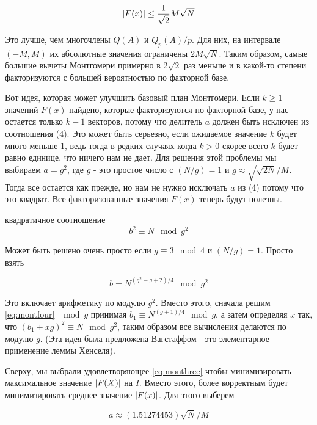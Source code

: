 \documentclass[a4paper,12pt]{report}
\DeclarePairedDelimiter\abs{\lvert}{\rvert}%
\begin{document}
\begin{equation*}
\abs{F(x)} \leq \frac{1}{\sqrt{2}}M\sqrt{N}
\end{equation*}

Это лучше, чем многочлены $Q(A)$ и $Q_p(A)/p$. Для них, на интервале $(-M, M)$ их абсолютные значения ограничены $2M\sqrt{N}$. Таким образом, самые большие вычеты Монтгомери примерно в $2\sqrt{2}$ раз меньше и в какой-то степени факторизуются с большей вероятностью по факторной базе.

Вот идея, которая может улучшить базовый план Монтгомери. Если $k \geq 1$ значений $F(x)$ найдено, которые факторизуются по факторной базе, у нас остается только $k - 1$ векторов, потому что делитель $a$ должен быть исключен из соотношения (4). Это может быть серьезно, если ожидаемое значение $k$ будет много меньше 1, ведь тогда в редких случаях когда $k > 0$ скорее всего $k$ будет равно единице, что ничего нам не дает. Для решения этой проблемы мы выбираем $a = g^2$, где $g$ - это простое число с $(N/g) = 1$ и $g \approx \sqrt{\sqrt{2N}/M}$. Тогда все остается как прежде, но нам не нужно исключать $a$ из (4) потому что это квадрат. Все факторизованные значения $F(x)$ теперь будут полезны.

квадратичное соотношение
\begin{equation}\label{eq:montfour}
b^2 \equiv N \mod g^2
\end{equation}

Может быть решено очень просто если $g \equiv 3 \mod 4$ и $(N/g) = 1$. Просто взять

\begin{equation*}
b = N^{(g^2 - g + 2)/4} \mod g^2
\end{equation*}

Это включает арифметику по модулю $g^2$. Вместо этого, сначала решим \eqref{eq:montfour} $\mod g$ принимая $b_1 \equiv N^{(g + 1)/4} \mod g$, а затем определяя $x$ так, что $(b_1 + xg)^2 \equiv N \mod g^2$, таким образом все вычисления делаются по модулю $g$. (Эта идея была предложена Вагстаффом - это элементарное применение леммы Хенселя).

Сверху, мы выбрали удовлетворяющее \eqref{eq:monthree} чтобы минимизировать максимальное значение $\abs{F(X)}$ на $I$. Вместо этого, более корректным будет минимизировать среднее значение $\abs{F(x)}$. Для этого выберем

\begin{equation*}
a \approx (1.51274453)\sqrt{N}/M
\end{equation*}
\end{document}
